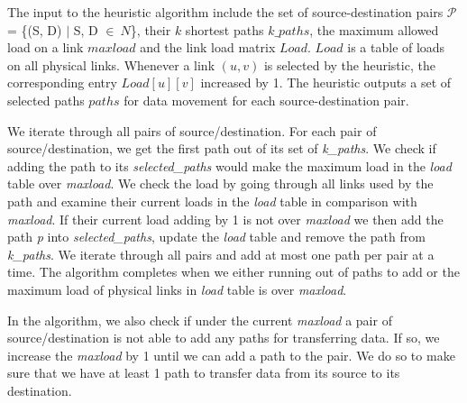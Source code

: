
The input to the heuristic algorithm include the set of source-destination pairs $\mathcal{P}$ = \{(S, D) $|$ S, D $\in~N$\}, their $k$ shortest paths {$k\_paths$}, the maximum allowed load on a link $maxload$ and the link load matrix $Load$. $Load$ is a table of loads on all physical links. Whenever a link $(u,v)$ is selected by the heuristic, the corresponding entry $Load[u][v]$ increased by 1. The heuristic outputs a set of selected paths $paths$ for data movement for each source-destination pair. 

We iterate through all pairs of source/destination. For each pair of source/destination, we get the first path out of its set of \textit{k\_paths}. We check if adding the path to its \textit{selected\_paths} would make the maximum load in the \textit{load} table over \textit{maxload}. We check the load by going through all links used by the path and examine their current loads in the \textit{load} table in comparison with \textit{maxload}. If their current load adding by 1 is not over \textit{maxload} we then add the path \textit{p} into \textit{selected\_paths}, update the \textit{load} table and remove the path from \textit{k\_paths}. We iterate through all pairs and add at most one path per pair at a time. The algorithm completes when we either running out of paths to add or the maximum load of physical links in \textit{load} table is over \textit{maxload}.

In the algorithm, we also check if under the current \textit{maxload} a pair of source/destination is not able to add any paths for transferring data. If so, we increase the \textit{maxload} by 1 until we can add a path to the pair. We do so to make sure that we have at least 1 path to transfer data from its source to its destination.

